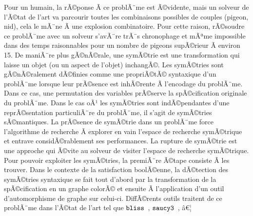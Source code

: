 
Pour un humain, la rÃ©ponse Ã  ce problÃ¨me est Ã©vidente, mais un solveur de l'Ã©tat de l'art va parcourir toutes 
les combinaisons possibles de couples (pigeon, nid), cela le mÃ¨ne Ã  une explosion combinatoire.
Pour cette raison, rÃ©soudre ce problÃ¨me avec un solveur s'avÃ¨re trÃ¨s chronophage et mÃªme impossible dans des temps raisonnables
pour un nombre de pigeons supÃ©rieur Ã  environ 15.
%
%
De maniÃ¨re plus  gÃ©nÃ©rale, une symÃ©trie est une transformation qui laisse un objet (ou un aspect de l'objet) inchangÃ©. Les symÃ©tries sont gÃ©nÃ©ralement dÃ©finies comme une propriÃ©tÃ© syntaxique d'un problÃ¨me lorsque leur prÃ©sence est inhÃ©rente Ã  l'encodage du problÃ¨me.
Dans ce cas, une permutation des variables prÃ©serve la spÃ©cification originale du problÃ¨me.
Dans le cas oÃ¹ les symÃ©tries sont indÃ©pendantes d'une reprÃ©sentation particuliÃ¨re du problÃ¨me, il s'agit de symÃ©tries sÃ©mantiques.
La prÃ©sence de symÃ©trie dans un problÃ¨me force l'algorithme de recherche Ã  explorer en vain l'espace de recherche symÃ©trique et entrave considÃ©rablement ses performances. La rupture de symÃ©trie est une approche qui Ã©vite au solveur de visiter l'espace de recherche symÃ©trique.
Pour pouvoir exploiter les symÃ©tries, la premiÃ¨re Ã©tape consiste Ã  les trouver. Dans le contexte de la satisfaction boolÃ©enne, la dÃ©tection des symÃ©tries syntaxique se fait tout d'abord par la transformation de la spÃ©cification en un graphe colorÃ© et ensuite Ã  l'application d'un outil d'automorphisme de graphe sur celui-ci.
DiffÃ©rents outils traitent de ce problÃ¨me dans l'Ã©tat de l'art tel que $\texttt{bliss}$~\cite{JunttilaKaski:ALENEX2007}, $\texttt{saucy3}$~\cite{katebi2010symmetry}, â€¦

